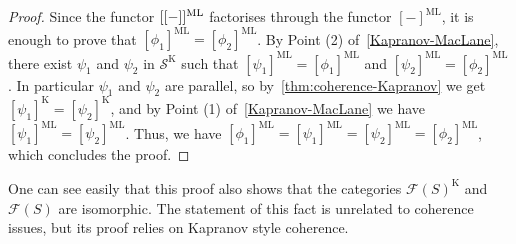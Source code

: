 {\begin{thm}
\end{thm}
\begin{proof} 
Since the functor $[[-]]^{\mathrm{ML}}$ factorises through the functor $[-]^{\mathrm{ML}}$, it is enough to prove that $[\phi_1]^{\mathrm{ML}}=
[\phi_2]^{\mathrm{ML}}$. 
By Point (2) of~\cref{Kapranov-MacLane}, there exist $\psi_1$ and $\psi_2$ in $\mathcal{S}^{\mathrm{K}}$ such that $[\psi_1]^{\mathrm{ML}}=[\phi_1]^{\mathrm{ML}}$ and 
$[\psi_2]^{\mathrm{ML}}=[\phi_2]^{\mathrm{ML}}$.
In particular $\psi_1$ and $\psi_2$ are parallel, so by~\cref{thm:coherence-Kapranov} we get $[\psi_1]^{\mathrm{K}}=[\psi_2]^{\mathrm{K}}$, and by Point (1) of~\cref{Kapranov-MacLane} we have $[\psi_1]^{\mathrm{ML}}=[\psi_2]^{\mathrm{ML}}$.
Thus, we have $[\phi_1]^{\mathrm{ML}} = [\psi_1]^{\mathrm{ML}} =  [\psi_2]^{\mathrm{ML}} =  [\phi_2]^{\mathrm{ML}}$, which concludes the proof.
\end{proof}
\begin{rem}
One can see easily that this proof  also shows that the categories  $\mathcal{F}(S)^{\mathrm{K}}$ and~$\mathcal{F}(S)$ are isomorphic.  
The statement of this fact is unrelated to coherence issues, but  its proof relies on Kapranov style coherence.
\end{rem}}

